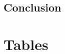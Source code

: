 \documentclass[a4paper,11pt]{article}
\begin{document}
%
%
%
%
%
%
%
%


\subsection{Conclusion}



\newpage

\section{Tables}
\end{document}
